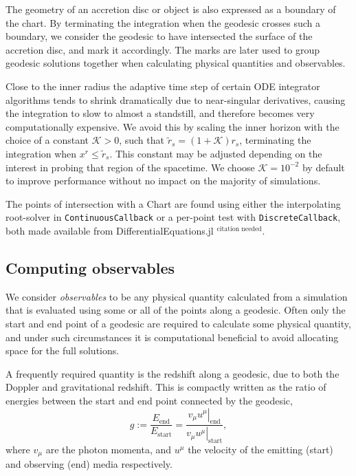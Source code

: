 \documentclass[fleqn,usenatbib]{mnras}
\newcommand{\citneeded}{{\bf \color{red} $^{\text{citation needed}}$}}
\begin{document}
The geometry of an accretion disc or object is also expressed as a boundary of
the chart. By terminating the integration when the geodesic crosses such a
boundary, we consider the geodesic to have intersected the surface of the
accretion disc, and mark it accordingly. The marks are later used to group
geodesic solutions together when calculating physical quantities and
observables.

Close to the inner radius the adaptive time step of certain ODE integrator
algorithms tends to shrink dramatically due to near-singular derivatives,
causing the integration to slow to almost a standstill, and therefore becomes
very computationally expensive. We avoid this by scaling the inner horizon
with the choice of a constant $\mathcal{K} > 0$, such that $\tilde{r}_s = (1 +
\mathcal{K}) r_s$, terminating the integration when $x^r \leq
\tilde{r}_s$. This constant may be adjusted depending on the interest
in probing that region of the spacetime. We choose $\mathcal{K} =
10^{-2}$ by default to improve performance without no impact on the majority of
simulations.

The points of intersection with a Chart are found using either the interpolating
root-solver in \texttt{ContinuousCallback} or a per-point test with
\texttt{DiscreteCallback}, both made available from DifferentialEquations.jl
\citneeded.

\subsection{Computing observables}
\label{sec:computing-observables}

We consider \textit{observables} to be any physical quantity calculated from a simulation that is evaluated using some or all of the points along a geodesic. Often only the start and end point of a geodesic are required to calculate some physical quantity, and under such circumstances it is computational beneficial to avoid allocating space for the full solutions.

A frequently required quantity is the redshift along a geodesic, due to both the Doppler and gravitational redshift. This is compactly written as the ratio of energies between the start and end point connected by the geodesic,
\begin{equation}
\label{eq:redshift}
g := \frac{E_\text{end}}{E_\text{start}} = \frac{\left. v_\mu u^\mu \right\rvert_\text{end}}{\left. v_\mu u^\mu \right\rvert_{\text{start}}},
\end{equation}
where $v_\mu$ are the photon momenta, and $u^\mu$ the velocity of the emitting (start) and observing (end) media respectively.
\end{document}

